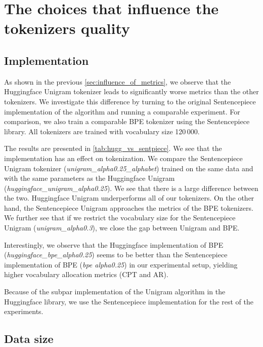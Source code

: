
\section{The choices that influence the tokenizers quality}

\subsection{Implementation}
\label{sec:implementation}



As shown in the previous \autoref{sec:influence_of_metrics}, we observe that the Huggingface Unigram tokenizer leads to significantly worse metrics than the other tokenizers. We investigate this difference by turning to the original Sentencepiece implementation of the algorithm and running a comparable experiment. For comparison, we also train a comparable BPE tokenizer using the Sentencepiece library. All tokenizers are trained with vocabulary size 120\,000.

The results are presented in \autoref{tab:hugg_vs_sentpiece}. We see that the implementation has an effect on tokenization. We compare the Sentencepiece Unigram tokenizer (\textit{unigram\_alpha0.25\_alphabet}) trained on the same data and with the same parameters as the Huggingface Unigram (\textit{huggingface\_unigram\_alpha0.25}). We see that there is a large difference between the two. Huggingface Unigram underperforms all of our tokenizers. On the other hand, the Sentencepiece Unigram approaches the metrics of the BPE tokenizers. We further see that if we restrict the vocabulary size for the Sentencepiece Unigram (\textit{unigram\_alpha0.3}), we close the gap between Unigram and BPE. 

Interestingly, we observe that the Huggingface implementation of BPE (\textit{huggingface\_bpe\_alpha0.25}) seems to be better than the Sentencepiece implementation of BPE (\textit{bpe alpha0.25}) in our experimental setup, yielding higher vocabulary allocation metrics (CPT and AR).

Because of the subpar implementation of the Unigram algorithm in the Huggingface library, we use the Sentencepiece implementation for the rest of the experiments.

\subsection{Data size}
\label{sec:data_size}

